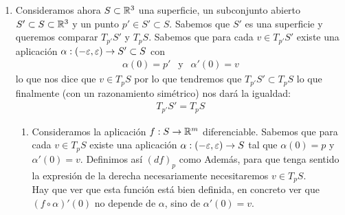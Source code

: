 \begin{ejemplo}
\begin{enumerate}
        \item Consideramos ahora $S\subset \mathbb{R}^3$ una superficie, un subconjunto abierto $S'\subset S \subset \mathbb{R}^3$ y un punto $p'\in S'\subset S$. Sabemos que $S'$ es una superficie y queremos comparar $T_{p'}S'$ y $T_pS$. Sabemos que para cada $v\in T_{p'}S'$ existe una aplicación $\alpha: (-\varepsilon, \varepsilon) \to S'\subset S$ con 
        \begin{gather*}
            \alpha(0) = p'\ \ \text{ y } \ \ \alpha'(0) = v
        \end{gather*}
        lo que nos dice que $v\in T_pS$ por lo que tendremos que $T_{p'}S'\subset T_pS$ lo que finalmente (con un razonamiento simétrico) nos dará la igualdad:
        \begin{gather*}
            T_{p'}S' = T_pS
        \end{gather*}

        \begin{enumerate}
            \item Consideramos la aplicación $f:S\to \mathbb{R}^m$ diferenciable. Sabemos que para cada $v\in T_pS$ existe una aplicación $\alpha: (-\varepsilon, \varepsilon) \to S$ tal que $\alpha(0)=p$ y $\alpha'(0)=v$.  Definimos así $(df)_p$ como 
            Además, para que tenga sentido la expresión de la derecha necesariamente necesitaremos $v\in T_pS$.\\

            Hay que ver que esta función está bien definida, en concreto ver que $(f\circ \alpha)'(0)$ no depende de $\alpha$, sino de $\alpha'(0)=v$.\\


\end{enumerate}
\end{enumerate}
\end{ejemplo}
